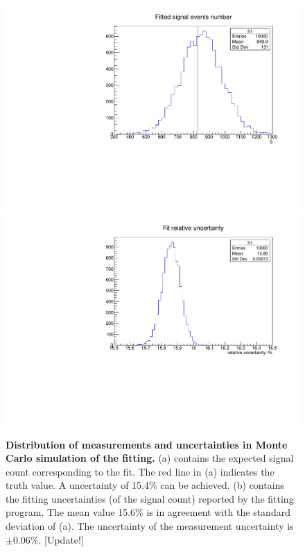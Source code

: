 \documentclass[11pt,a4paper]{cepcnote}
\begin{document}
\begin{figure}[h]
	\includegraphics[scale=0.35,clip]{NFit.pdf}
	\includegraphics[scale=0.35,clip]{DNFit.pdf}
	\centering
	\caption{\textbf{Distribution of measurements and uncertainties in Monte Carlo simulation of the fitting.} (a) contains the expected signal count corresponding to the fit. The red line in (a) indicates the truth value. A uncertainty of 15.4\% can be achieved. (b) contains the fitting uncertainties (of the signal count) reported by the fitting program. The mean value 15.6\% is in agreement with the standard deviation of (a). The uncertainty of the measurement uncertainty is $\pm 0.06\%$. [Update!]}
	\label{fig:N-DN}
\end{figure}
\end{document}
